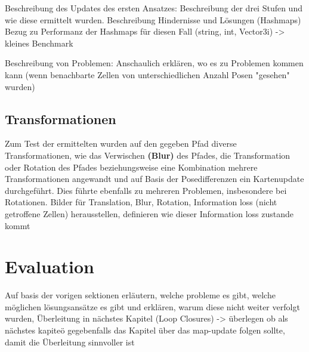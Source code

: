 Beschreibung des Updates des ersten Ansatzes:
Beschreibung der drei Stufen und wie diese ermittelt wurden.
Beschreibung Hindernisse und Lösungen (Hashmaps)
Bezug zu Performanz der Hashmaps für diesen Fall (string, int, Vector3i)
-> kleines Benchmark

Beschreibung von Problemen:
Anschaulich erklären, wo es zu Problemen kommen kann (wenn benachbarte Zellen von unterschiedlichen Anzahl Posen "gesehen" wurden)

\subsection{Transformationen}




Zum Test der ermittelten wurden auf den gegeben Pfad diverse Transformationen, wie das Verwischen \textbf{(Blur)} des Pfades, die Transformation oder Rotation des Pfades beziehungsweise eine Kombination mehrere Transformationen angewandt und auf Basis der Posedifferenzen ein Kartenupdate durchgeführt. Dies führte ebenfalls zu mehreren Problemen, insbesondere bei Rotationen.
Bilder für Translation, Blur, Rotation, Information loss (nicht getroffene Zellen) herausstellen, definieren wie dieser Information loss zustande kommt

\section{Evaluation}

Auf basis der vorigen sektionen erläutern, welche probleme es gibt, welche möglichen lösungsansätze es gibt und erklären, warum diese nicht weiter verfolgt wurden,
Überleitung in nächstes Kapitel (Loop Closures)
-> überlegen ob als nächstes kapiteö gegebenfalls das Kapitel über das map-update folgen sollte, damit die Überleitung sinnvoller ist



